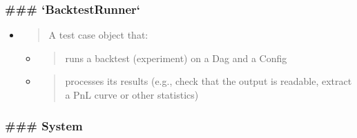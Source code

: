 \documentclass[11pt, reqno]{amsart}
\begin{document}
\hypertarget{backtestrunner}{%
\subsubsection{\texorpdfstring{\textbf{\#\#\#
`BacktestRunner`}}{\#\#\# `BacktestRunner`}}\label{backtestrunner}}

\begin{itemize}
\item
  \begin{quote}
  A test case object that:
  \end{quote}

  \begin{itemize}
  \item
    \begin{quote}
    runs a backtest (experiment) on a Dag and a Config
    \end{quote}
  \item
    \begin{quote}
    processes its results (e.g., check that the output is readable,
    extract a PnL curve or other statistics)
    \end{quote}
  \end{itemize}
\end{itemize}

\hypertarget{system}{%
\subsubsection{\texorpdfstring{\textbf{\#\#\#
System}}{\#\#\# System}}\label{system}}
\end{document}
